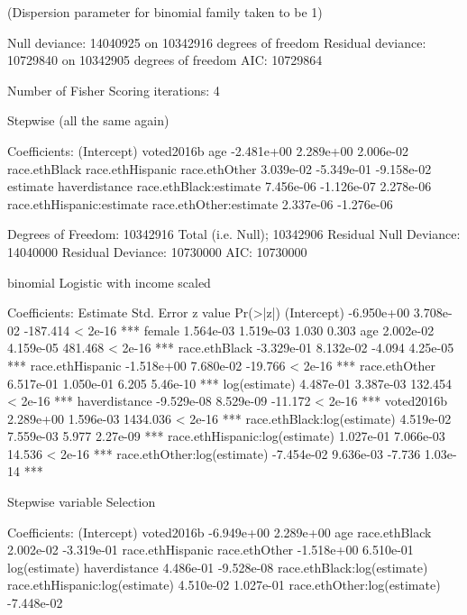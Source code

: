 (Dispersion parameter for binomial family taken to be 1)

    Null deviance: 14040925  on 10342916  degrees of freedom
Residual deviance: 10729840  on 10342905  degrees of freedom
AIC: 10729864

Number of Fisher Scoring iterations: 4



Stepwise (all the same again)

Coefficients:
              (Intercept)                 voted2016b                        age
               -2.481e+00                  2.289e+00                  2.006e-02
            race.ethBlack           race.ethHispanic              race.ethOther
                3.039e-02                 -5.349e-01                 -9.158e-02
                 estimate              haverdistance     race.ethBlack:estimate
                7.456e-06                 -1.126e-07                  2.278e-06
race.ethHispanic:estimate     race.ethOther:estimate
                2.337e-06                 -1.276e-06

Degrees of Freedom: 10342916 Total (i.e. Null);  10342906 Residual
Null Deviance:	    14040000
Residual Deviance: 10730000 	AIC: 10730000





binomial Logistic with income scaled


Coefficients:
                                 Estimate Std. Error  z value Pr(>|z|)
(Intercept)                    -6.950e+00  3.708e-02 -187.414  < 2e-16 ***
female                          1.564e-03  1.519e-03    1.030    0.303
age                             2.002e-02  4.159e-05  481.468  < 2e-16 ***
race.ethBlack                  -3.329e-01  8.132e-02   -4.094 4.25e-05 ***
race.ethHispanic               -1.518e+00  7.680e-02  -19.766  < 2e-16 ***
race.ethOther                   6.517e-01  1.050e-01    6.205 5.46e-10 ***
log(estimate)                   4.487e-01  3.387e-03  132.454  < 2e-16 ***
haverdistance                  -9.529e-08  8.529e-09  -11.172  < 2e-16 ***
voted2016b                      2.289e+00  1.596e-03 1434.036  < 2e-16 ***
race.ethBlack:log(estimate)     4.519e-02  7.559e-03    5.977 2.27e-09 ***
race.ethHispanic:log(estimate)  1.027e-01  7.066e-03   14.536  < 2e-16 ***
race.ethOther:log(estimate)    -7.454e-02  9.636e-03   -7.736 1.03e-14 ***


Stepwise variable Selection

Coefficients:
                   (Intercept)                      voted2016b
                    -6.949e+00                       2.289e+00
                           age                   race.ethBlack
                     2.002e-02                      -3.319e-01
              race.ethHispanic                   race.ethOther
                    -1.518e+00                       6.510e-01
                 log(estimate)                   haverdistance
                     4.486e-01                      -9.528e-08
   race.ethBlack:log(estimate)  race.ethHispanic:log(estimate)
                     4.510e-02                       1.027e-01
   race.ethOther:log(estimate)
                    -7.448e-02

